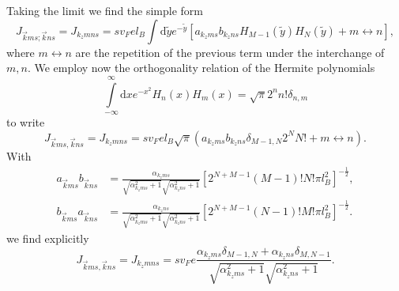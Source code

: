 Taking the limit we find the simple form
\begin{equation}
  \label{eq:74}
  J_{\vec{k} m s; \vec{k} n s} = J_{k_z m n s} =
  s v_F e l_B \int \mathrm{d}\tilde{y} e^{-\tilde{y} }
  \left[
    a_{k_zms} b_{k_z n s} H_{M-1}(\tilde{y} )H_N(\tilde{y} )
    + m \leftrightarrow n
  \right],
\end{equation}
where \( m \leftrightarrow n \) are the repetition of the previous term under the interchange of \( m, n \).
We employ now the orthogonality relation of the Hermite polynomials \cite[Table~18.3.1]{NIST:DLMF}
\begin{equation}
  \label{eq:hermite-ortho}
  \int\limits_{-\infty}^{\infty} \mathrm{d}x e^{-x^2} H_n(x)H_m(x) = \sqrt{\pi} 2^{n} n! \delta_{n,m}
\end{equation}
to write
\begin{equation}
  J_{\vec{k} m s, \vec{k} n s} = J_{k_z m n s}
  = s v_F e l_B \sqrt{\pi} (a_{k_z ms} b_{k_z n s} \delta_{M-1, N} 2^N N! + m \leftrightarrow n).
\end{equation}
With
\begin{align}
  a_{\vec{k}ms}b_{\vec{k}ns} &= 
  \frac{\alpha_{k_z ms} }{
    \sqrt{\alpha_{k_z ms}^2 +1}
    \sqrt{\alpha_{k_z ns}^2 + 1}
  }
  \left[ 2^{N+M-1} (M-1)! N! \pi l_B^2 \right]^{-\frac{1}{2}},\\
  b_{\vec{k}ms}a_{\vec{k} ns} &= 
  \frac{\alpha_{k_z ns} }{
    \sqrt{\alpha_{k_z ms}^2 +1}
    \sqrt{\alpha_{k_z ns}^2 + 1}
  }
  \left[ 2^{N+M-1} (N-1)! M! \pi l_B^2 \right]^{-\frac{1}{2}}.
\end{align}
we find explicitly
\begin{equation}
  J_{\vec{k} m s, \vec{k} n s} = J_{k_z m n s} =
  s v_F e
  \frac{\alpha_{k_z m s} \delta_{M-1, N} + \alpha_{k_z n s} \delta_{M, N-1}}{\sqrt{\alpha_{k_z m s}^2 + 1} \sqrt{\alpha_{k_z n s}^2 + 1}}.
\end{equation}


